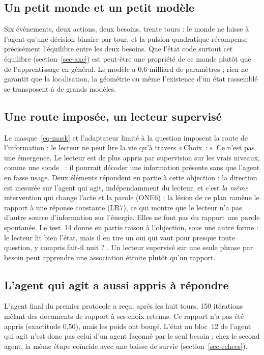 \documentclass[11pt,a4paper]{article}
\newcommand{\Choix}{«\,Choix~:\,»}
\begin{document}
\subsection{Un petit monde et un petit modèle}

Six événements, deux actions, deux besoins, trente tours : le monde ne laisse à
l'agent qu'une décision binaire par tour, et la pulsion quadratique récompense
précisément l'équilibre entre les deux besoins. Que l'état code surtout cet
équilibre (section~\ref{sec-axe}) est peut-être une propriété de ce monde plutôt que
de l'apprentissage en général. Le modèle a 0,6 milliard de paramètres ; rien ne
garantit que la localisation, la géométrie ou même l'existence d'un état rassemblé
se transposent à de grands modèles.

\subsection{Une route imposée, un lecteur supervisé}

Le masque~\eqref{eq-mask} et l'adaptateur limité à la question imposent la route de
l'information : le lecteur ne peut lire la vie qu'à travers \Choix{}. Ce n'est pas
une émergence. Le lecteur est de plus appris par supervision sur les vrais niveaux,
comme une sonde~\cite{hewitt2019,belinkov2022} : il pourrait décoder une information
présente sans que l'agent en fasse usage. Deux éléments répondent en partie à cette
objection : la direction est mesurée sur l'agent qui agit, indépendamment du lecteur,
et c'est \emph{la même} intervention qui change l'acte et la parole (ONE6) ; la lésion
de ce plan ramène le rapport à une réponse constante (LR7), ce qui montre que le
lecteur n'a pas d'autre source d'information sur l'énergie. Elles ne font pas du
rapport une parole spontanée. Le test~14 donne en partie raison à l'objection, sous
une autre forme : le lecteur lit bien l'état, mais il en tire un \og oui \fg{} qui vaut
pour presque toute question, y compris \og fait-il nuit ? \fg{}. Un lecteur supervisé
sur une seule phrase par besoin peut apprendre une association étroite plutôt qu'un
rapport.

\subsection{L'agent qui agit a aussi appris à répondre}

L'agent final du premier protocole a reçu, après les huit tours, 150 itérations
mêlant des documents de rapport à ses choix retenus. Ce rapport n'a pas été appris
(exactitude 0,50), mais les poids ont bougé. L'état au bloc~12 de \og l'agent qui
agit \fg{} n'est donc pas celui d'un agent façonné par le seul besoin ; chez le
second agent, la même étape coïncide avec une baisse de survie
(section~\ref{sec-echecs}).
\end{document}
